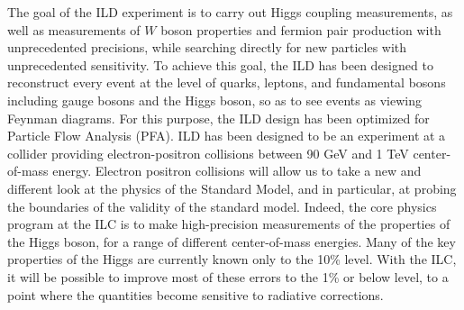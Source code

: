 The goal of the ILD experiment is to carry out Higgs coupling measurements, as well as measurements of  $W$ boson properties and fermion pair production with unprecedented precisions, while searching directly for new particles with unprecedented sensitivity.
To achieve this goal, the ILD has been designed to reconstruct every event at the level of quarks, leptons, and fundamental bosons including gauge bosons and the Higgs boson, so as to see events as viewing Feynman diagrams. For this purpose, the ILD design has been optimized for Particle Flow Analysis (PFA).
ILD has been designed to be an experiment at a collider providing electron-positron collisions between 90 GeV and 1 TeV center-of-mass energy. 
Electron positron collisions will allow us to take a new and different look at the physics of the Standard Model, and in particular, at probing the boundaries of the validity of the standard model. 
Indeed, the core physics program at the ILC is to make high-precision
 measurements of the properties of the Higgs boson, for a range of different center-of-mass energies. 
Many of the key properties of the Higgs are currently known only to the 10\% level. With the ILC, it will be possible to improve most of these errors to the 1\% or below level, to a point where the quantities become sensitive to radiative corrections. %



